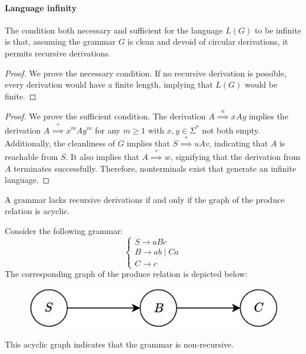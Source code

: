 \paragraph*{Language infinity}
The condition both necessary and sufficient for the language $L(G)$ to be infinite is that, assuming the grammar $G$ is clean and devoid of circular derivations, it permits recursive derivations.
\begin{proof}
    We prove the necessary condition.
    If no recursive derivation is possible, every derivation would have a finite length, implying that $L(G)$ would be finite.
\end{proof}
\begin{proof}
    We prove the sufficient condition.
    The derivation $A\overset{n}{\implies}xAy$ implies the derivation $A\overset{+}{\implies}x^mAy^m$ for any $m \geq 1$ with $x,y \in \Sigma^\ast$ not both empty. 
    Additionally, the cleanliness of $G$ implies that $S\overset{\ast}{\implies}uAv$, indicating that $A$ is reachable from $S$. 
    It also implies that $A\overset{+}{\implies}w$, signifying that the derivation from $A$ terminates successfully. 
    Therefore, nonterminals exist that generate an infinite language.
\end{proof}
\begin{property}
    A grammar lacks recursive derivations if and only if the graph of the produce relation is acyclic.
\end{property}
\begin{example}
    Consider the following grammar:
    \[\begin{cases}
        S \rightarrow aBc \\
        B \rightarrow ab \mid Ca \\
        C \rightarrow c
    \end{cases}\]
    The corresponding graph of the produce relation is depicted below:
    \begin{figure}[H]
        \centering
        \includegraphics[width=0.5\linewidth]{images/produce.png}
    \end{figure}
    This acyclic graph indicates that the grammar is non-recursive.
\end{example}